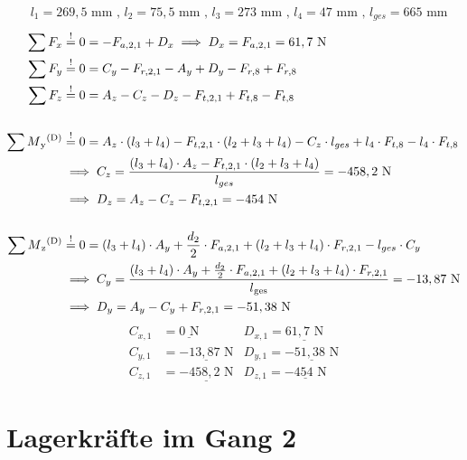 \begin{itemize}
\begin{center}
\end{center}
\begin{align*}
&l_{1} =269,5\text{ mm} \text{ , } l_{2} = 75,5\text{ mm} \text{ , } l_{3} = 273\text{ mm}  \text{ , } l_{4} = 47\text{ mm} \text{ , } l_{ges} = 665\text{ mm}
\end{align*}
\begin{align*}
	\sum F_x &\overset{!}{=} 0 = -F_{a,2,1} + D_x \implies D_x = F_{a,2,1} = 61,7 \text{ N} \\
	\sum F_y &\overset{!}{=} 0 = C_y - F_{r,2,1}-A_y +D_y - F_{r,8} + F_{r,8}\\ 
	\sum F_z &\overset{!}{=} 0 = A_z - C_z - D_z - F_{t,2,1} + F_{t,8} - F_{t,8}\\ \\
	\sum M\textsubscript{y}\textsuperscript{(D)} &\overset{!}{=} 0 = A_z \cdot (l_3+l_4)- F_{t,2,1} \cdot (l_2+l_3+l_4) - C_z \cdot l_{ges} +l_4 \cdot F_{t,8}- l_4 \cdot F_{t,8} \\ 
	&\implies C_z = \frac{(l_3+l_4) \cdot A_z - F_{t,2,1} \cdot (l_2+l_3+l_4)}{l_{ges}} = -458,2 \text { N} \\ 
	& \implies D_z = A_z - C_z - F_{t,2,1}= -454 \text{ N}\\ \\
	\sum M\textsubscript{z}\textsuperscript{(D)} &\overset{!}{=} 0 = (l_3+l_4) \cdot A_y + \frac{d_2}{2} \cdot F_{a,2,1} + (l_2+l_3+l_4) \cdot F_{r,2,1}- l_{ges} \cdot C_y  \\ 
	&\implies C_y = \frac{(l_3+l_4) \cdot A_y + \frac{d_2}{2} \cdot F_{a,2,1} + (l_2+l_3+l_4) \cdot F_{r,2,1}}{l\textsubscript{ges}} = -13,87 \text{ N}\\ 
	& \implies D_y =   A_y - C_y + F_{r,2,1} = -51,38\text{ N}
\end{align*}
\begin{align*}
	C_{x,1} &= \underline{0\text{ N}} & D_{x,1}= \underline{61,7\text{ N}}\\
	C_{y,1} &= \underline{-13,87\text{ N}} & D_{y,1}= \underline{-51,38\text{ N}}\\
	C_{z,1} &= \underline{-458,2\text{ N}} & D_{z,1}= \underline{-454\text{ N}}
\end{align*}
\end{itemize}
\section{Lagerkräfte im Gang 2}
